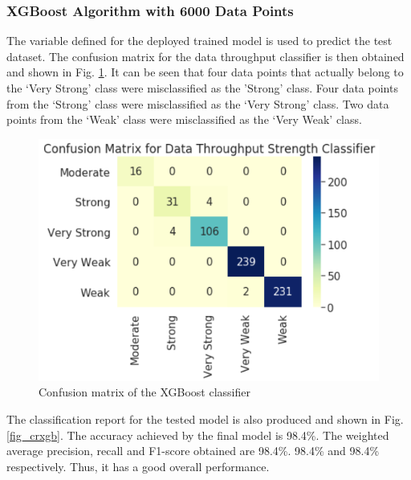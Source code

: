 \subsubsection{XGBoost Algorithm with 6000 Data Points}
The variable defined for the deployed trained model is used to predict the test dataset. The confusion matrix for the data throughput classifier is then obtained and shown in Fig. \ref{fig_cmxgb}. It can be seen that four data points that actually belong to the `Very Strong' class were misclassified as the 'Strong' class. Four data points from the `Strong' class were misclassified as the `Very Strong' class. Two data points from the `Weak' class were misclassified as the `Very Weak' class.

\begin{figure} [ht]
    \centering
    \includegraphics[scale=1.0]{pages/Chapter5/Chapter 5 images/cm_xgb6k.PNG}
    \caption{Confusion matrix of the XGBoost classifier}
    \label{fig_cmxgb}
\end{figure}

 The classification report for the tested model is also produced and shown in Fig. \ref{fig_crxgb}. The accuracy achieved by the final model is 98.4\%. The weighted average precision, recall and F1-score obtained are 98.4\%. 98.4\% and 98.4\% respectively. Thus, it has  a good overall performance. 
 
